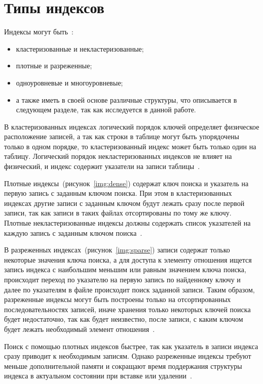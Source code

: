 \section{Типы индексов}

Индексы могут быть~\cite{ship}:
\begin{itemize}
    \item кластеризованные и некластеризованные;
    \item плотные и разреженные;
    \item одноуровневые и многоуровневые;
    \item а также иметь в своей основе различные структуры, что описывается в
        следующем разделе, так как исследуется в данной работе.
\end{itemize}

В кластеризованных индексах логический порядок ключей определяет
физическое расположение записей, а так как строки в таблице могут быть
упорядочены только в одном порядке, то кластеризованный индекс может быть
только один на таблицу. Логический порядок {некластеризованных} индексов
не влияет на физический, и индекс содержит указатели на записи
таблицы~\cite{osip}.

Плотные индексы~(рисунок~\ref{img:dense}) содержат ключ поиска и
указатель на первую запись с заданным ключом поиска. При этом в кластеризованных
индексах другие записи с заданным ключом будут лежать сразу после первой записи,
так как записи в таких файлах отсортированы по тому же ключу. Плотные
некластеризованные индексы должны содержать список указателей на каждую запись с
заданным ключом поиска~\cite{ship}.
 

В разреженных индексах~(рисунок~\ref{img:sparse}) записи содержат
только некоторые значения ключа поиска, а для доступа к элементу отношения
ищется запись индекса с наибольшим меньшим или равным значением ключа поиска,
происходит переход по указателю на первую запись по найденному ключу и далее по
указателям в файле происходит поиск заданной записи. Таким образом, разреженные
индексы могут быть построены только на отсортированных последовательностях
записей, иначе хранения только некоторых ключей поиска будет недостаточно, так
как будет неизвестно, после записи, с каким ключом будет лежать необходимый
элемент отношения~\cite{ship}.


Поиск с помощью плотных индексов быстрее, так как указатель в записи индекса
сразу приводит к необходимым записям. Однако разреженные индексы требуют меньше
дополнительной памяти и сокращают время поддержания структуры индекса в
актуальном состоянии при вставке или удалении~\cite{ship}.

